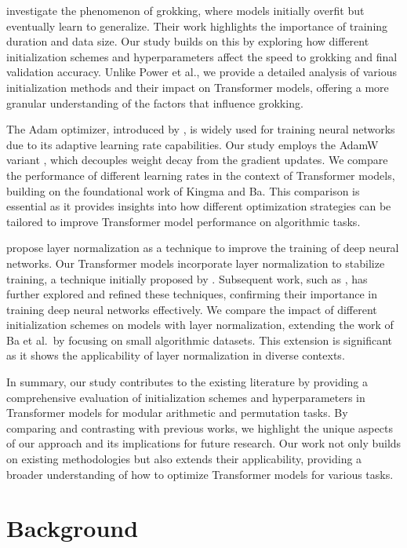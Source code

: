 \documentclass{article} %
\begin{document}
\citet{power2022grokking} investigate the phenomenon of grokking, where models initially overfit but eventually learn to generalize. Their work highlights the importance of training duration and data size. Our study builds on this by exploring how different initialization schemes and hyperparameters affect the speed to grokking and final validation accuracy. Unlike Power et al., we provide a detailed analysis of various initialization methods and their impact on Transformer models, offering a more granular understanding of the factors that influence grokking.

The Adam optimizer, introduced by \citet{kingma2014adam}, is widely used for training neural networks due to its adaptive learning rate capabilities. Our study employs the AdamW variant \citep{loshchilov2017adamw}, which decouples weight decay from the gradient updates. We compare the performance of different learning rates in the context of Transformer models, building on the foundational work of Kingma and Ba. This comparison is essential as it provides insights into how different optimization strategies can be tailored to improve Transformer model performance on algorithmic tasks.

\citet{ba2016layer} propose layer normalization as a technique to improve the training of deep neural networks. Our Transformer models incorporate layer normalization to stabilize training, a technique initially proposed by \citet{ba2016layer}. Subsequent work, such as \citet{Ziaee2022BatchLN}, has further explored and refined these techniques, confirming their importance in training deep neural networks effectively. We compare the impact of different initialization schemes on models with layer normalization, extending the work of Ba et al.\ by focusing on small algorithmic datasets. This extension is significant as it shows the applicability of layer normalization in diverse contexts.

In summary, our study contributes to the existing literature by providing a comprehensive evaluation of initialization schemes and hyperparameters in Transformer models for modular arithmetic and permutation tasks. By comparing and contrasting with previous works, we highlight the unique aspects of our approach and its implications for future research. Our work not only builds on existing methodologies but also extends their applicability, providing a broader understanding of how to optimize Transformer models for various tasks.

\section{Background}
\label{sec:background}
\end{document}
